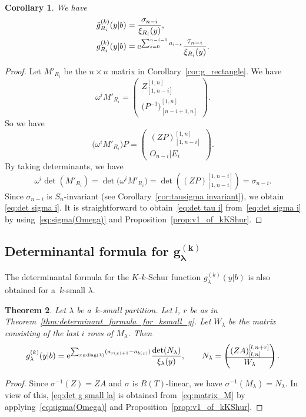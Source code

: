 \documentclass[10pt,a4paper]{amsart}
\numberwithin{equation}{section}
\newcommand{\co}{\xi}
\newcommand{\la}{\lambda}
\newcommand{\Rep}{{R(T)}}
\newtheorem{Theorem}{Theorem}[section]
\newtheorem{Corollary}[Theorem]{Corollary}
\theoremstyle{definition}
\begin{document}
\begin{Corollary}\label{cor:k rect and tau}
We have
 \begin{align}
 \tilde{g}^{(k)}_{R_i}(y|b)&=
 \frac{\sigma_{n-i}}{\co_{R_i}(y)},\label{eq:det sigma i}
 \\ g^{(k)}_{R_i}(y|b)&=
{\rm e}^{\sum_{s=0}^{n-i-1}a_{i-s}}
 \frac{
 \tau_{n-i}}{\co_{R_i}(y)}.\label{eq:det tau i}\end{align}
\end{Corollary}
\begin{proof}
Let $M'_{R_i}$ be the $n\times n$ matrix in Corollary~\ref{cor:g_rectangle}. We have
\[
\omega^{i}M'_{R_i}=
\left(
\begin{matrix}
Z_{[1,n-i]}^{[1,n]}\\\hline
{
\bigl(P^{-1}\bigr)}^{[1,n]}_{[n-i+1,n]}
\end{matrix}
\right).
\]
So we have
\[
\bigl(\omega^{i}M'_{R_i}\bigr)P=
\left(
\begin{matrix}
(ZP)_{[1,n-i]}^{[1,n]}\\
\hline
O_{n-i}|E_{i}
\end{matrix}
\right).
\]
By taking determinants, we have
\[
\omega^{i}\det(M'_{R_i})
=\det\bigl(\omega^{i}M'_{R_i}\bigr)=\det\left((ZP)^{[1,n-i]}_{[1,n-i]}\right)=\sigma_{n-i}.
\]
Since $\sigma_{n-i}$ is $S_n$-invariant (see Corollary~\ref{cor:tausigma invariant}), we obtain
\eqref{eq:det sigma i}.
%
It is straightforward to obtain~\eqref{eq:det tau i} from~\eqref{eq:det sigma i}
by using~\eqref{eq:sigma(Omega)} and
Proposition~\ref{prop:v1_of_kKShur}.
\end{proof}



\subsection[Determinantal formula for g\^{}(k)\_lambda]{Determinantal formula for $\boldsymbol{g^{(k)}_\lambda}$}

The determinantal formula for the $K$-$k$-Schur function $g^{(k)}_\lambda(y|b)$ is also obtained for a~$k$-small $\lambda$.
\begin{Theorem}\label{thm:determinantal_formula_for_g}
Let $\lambda$ be a~$k$-small partition.
Let $l$, $r$ be as in Theorem~{\rm\ref{thm:determinant_formula_for_ksmall_g}}.
Let $W_\la$ be the matrix consisting of the last $i$ rows of $M_{\la}$.
Then \begin{equation}
g^{(k)}_{\lambda}(y|b)
={\rm e}^{\sum_{x\in \mathrm{diag}(\lambda)}(a_{r(x)+1}-a_{b(x)})}
\frac{\det(N_\lambda)}{\co_\la(y)},\qquad
N_\lambda=
\left(
\begin{matrix}
 (ZA)_{[l,n]}^{[l,n+r]} \\ \hline
 W_{\la}
\end{matrix}
\right).
\label{eq:det g small la}
\end{equation}
\end{Theorem}
\begin{proof} Since $\sigma^{-1}(Z)=ZA$ and $\sigma$ is $\Rep$-linear, we have
$\sigma^{-1}(M_\la)=N_\la.
$ In view of this,
\eqref{eq:det g small la}
is obtained from~\eqref{eq:matrix_M} by applying~\eqref{eq:sigma(Omega)} and Proposition~\ref{prop:v1_of_kKShur}.
\end{proof}
\end{document}
